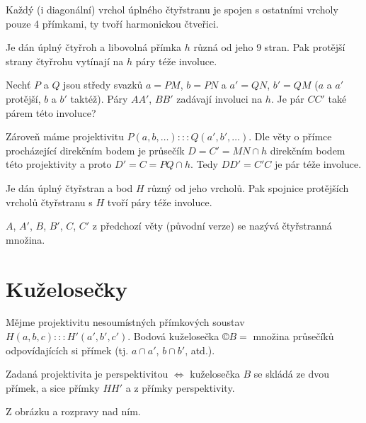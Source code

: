 \documentclass[12pt]{article}					%
\begin{document}
\begin{veta}
	Každý (i diagonální) vrchol úplného čtyřstranu je spojen s ostatními vrcholy pouze 4 přímkami, ty tvoří harmonickou čtveřici.
\end{veta}

\begin{veta}
	Je dán úplný čtyřroh a libovolná přímka $h$ různá od jeho 9 stran. Pak protější strany čtyřrohu vytínají na $h$ páry téže involuce.

	\begin{dukazin}
		Nechť $P$ a $Q$ jsou středy svazků $a = PM$, $b = PN$ a $a' = QN$, $b' = QM$ ($a$ a $a'$ protější, $b$ a $b'$ taktéž). Páry $AA'$, $BB'$ zadávají involuci na $h$. Je pár $CC'$ také párem této involuce?

		Zároveň máme projektivitu $P(a, b, …) ::: Q(a', b', …)$. Dle věty o přímce procházející direkčním bodem je průsečík $D = C' = MN \cap h$ direkčním bodem této projektivity a proto $D' = C = PQ \cap h$. Tedy $DD' = C'C$ je pár téže involuce.
	\end{dukazin}
\end{veta}

\begin{veta}
	Je dán úplný čtyřstran a bod $H$ různý od jeho vrcholů. Pak spojnice protějších vrcholů čtyřstranu s $H$ tvoří páry téže involuce.
\end{veta}

\begin{poznamka}
	$A$, $A'$, $B$, $B'$, $C$, $C'$ z předchozí věty (původní verze) se nazývá čtyřstranná množina.
\end{poznamka}

\section{Kuželosečky}
\begin{definice}
	Mějme projektivitu nesoumístných přímkových soustav $H(a, b, c) ::: H'(a', b', c')$. Bodová kuželosečka $©B = $ množina průsečíků odpovídajících si přímek (tj. $a \cap a'$, $b \cap b'$, atd.).
\end{definice}

\begin{veta}
	Zadaná projektivita je perspektivitou $\Leftrightarrow$ kuželosečka $B$ se skládá ze dvou přímek, a sice přímky $HH'$ a z přímky perspektivity.

	\begin{dukazin}
		Z obrázku a rozpravy nad ním.
	\end{dukazin}
\end{veta}
\end{document}
